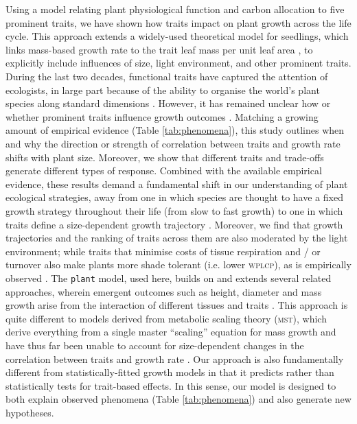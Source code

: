 \documentclass[9pt,twocolumn,twoside]{pnas-new}
\newcommand{\plant}{\texttt{plant}}
\begin{document}
Using a model relating plant physiological function and carbon allocation to five prominent traits, we have shown how traits impact on plant growth across the life cycle. This approach extends a widely-used theoretical model for seedlings, which links mass-based growth rate to the trait leaf mass per unit leaf area \citep{Lambers-1992, Wright-2000}, to explicitly include influences of size, light environment, and other prominent traits. During the last two decades, functional traits have captured the attention of ecologists, in large part because of the ability to organise the world's plant species along standard dimensions \citep{Westoby-2002}. However, it has remained unclear how or whether prominent traits influence growth outcomes \citep{Poorter-2008, Wright-2010,Paine-2015}. Matching a growing amount of empirical evidence (Table \ref{tab:phenomena}), this study outlines when and why the direction or strength of correlation between traits and growth rate shifts with plant size. Moreover, we show that different traits and trade-offs generate different types of response. Combined with the available empirical evidence, these results demand a fundamental shift in our understanding of plant ecological strategies, away from one in which species are thought to have a fixed growth strategy throughout their life (from slow to fast growth) \citep[e.g.][]{Grime-1977, Adler-2014, Paine-2015} to one in which traits define a size-dependent growth trajectory \citep{Gibert-2016}. Moreover, we find that growth trajectories and the ranking of traits across them are also moderated by the light environment; while traits that minimise costs of tissue respiration and / or turnover also make plants more shade tolerant (i.e. lower \textsc{wplcp}), as is empirically observed \citep{Messier-1999, Craine-2005, Poorter-2006, Baltzer-2007, Lusk-2008}. The {\plant} model, used here, builds on and extends several related approaches, wherein emergent outcomes such as height, diameter and mass growth arise from the interaction of different tissues and traits \citep[e.g.][]{Givnish-1988, Makela-1997, Moorcroft-2001}. This approach is quite different to models derived from metabolic scaling theory (\textsc{mst}), which derive everything from a single master ``scaling'' equation for mass growth and have thus far been unable to account for size-dependent changes in the correlation between traits and growth rate \citep{Enquist-1999, Enquist-2007}. Our approach is also fundamentally different from statistically-fitted growth models \citep[e.g.][]{Herault-2011, Ruger-2012, Iida-2014} in that it predicts rather than statistically tests for trait-based effects. In this sense, our model is designed to both explain observed phenomena (Table \ref{tab:phenomena}) and also generate new hypotheses.
\end{document}
